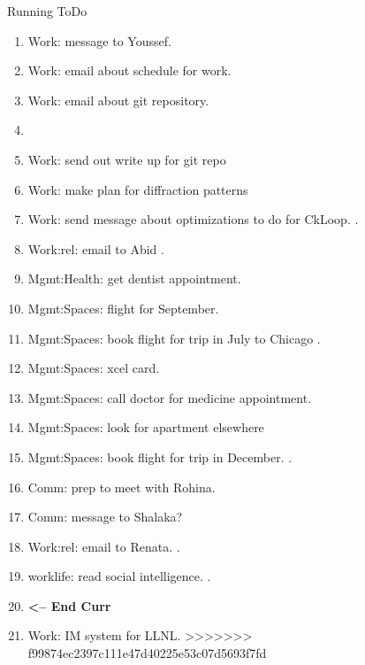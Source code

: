 \begin{columns}
\begin{column}{0.6\linewidth}
\begin{block}{Running ToDo}
\begin{enumerate}
        \item \tiny Work: message to Youssef.   

        \item \tiny Work: email about schedule for work. 
        \item \tiny Work: email about git repository. 
        \item \tiny 

        \item \tiny Work: send out write up for git repo 
        \item \tiny Work: make plan for diffraction patterns
        \item \tiny Work: send message about optimizations to do for
          CkLoop.  .
         
        \item \tiny Work:rel: email to Abid . 

        \item \tiny Mgmt:Health: get dentist appointment. 

        \item \tiny Mgmt:Spaces: flight for September. 
        \item \tiny Mgmt:Spaces: book flight for trip in July to Chicago .   
          
        \item \tiny Mgmt:Spaces: xcel card. 
        \item \tiny Mgmt:Spaces: call doctor for medicine appointment.

        \item \tiny Mgmt:Spaces: look for apartment elsewhere          

        \item \tiny Mgmt:Spaces: book flight for trip in December. .

        \item \tiny  Comm: prep to meet with Rohina. 
        \item \tiny Comm: message to Shalaka?
        \item \tiny Work:rel: email to Renata. .
        \item \tiny worklife: read social intelligence. .           
          
        \item \tiny \textbf{ <-- End Curr } 
          
        \item \tiny Work: IM system for LLNL.
>>>>>>> f99874ec2397c111e47d40225e53c07d5693f7fd
        \end{enumerate}
      \end{block}
      

\end{column}
\end{columns}
